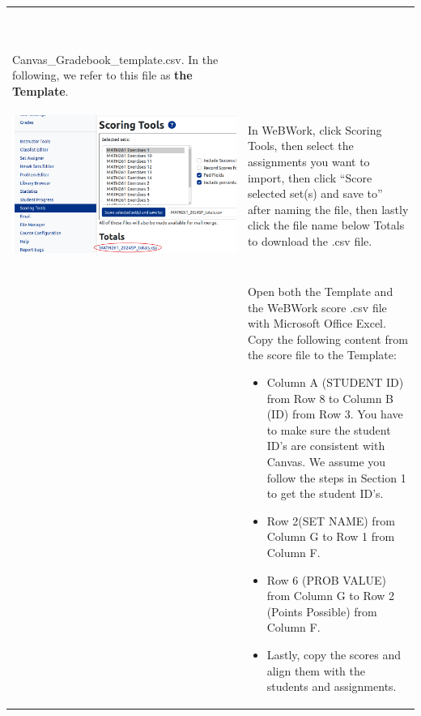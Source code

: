 \documentclass{article}
\begin{document}
{\centering
\begin{longtable}{|l|l|}
\hline
\begin{parbox}{0.45\textwidth}{\ }
\end{parbox}&\begin{parbox}{0.45\textwidth}{Download a copy of\\ Canvas\_Gradebook\_template.csv. In the following, we refer to this file as {\bf the Template}. }
\end{parbox}\\
\hline
\begin{parbox}{0.45\textwidth}{\includegraphics[width=.45\textwidth]{scoringTools.png}}
\end{parbox}&\begin{parbox}{0.45\textwidth}{In WeBWork, click Scoring Tools, then select the assignments you want to import, then click ``Score selected set(s) and save to'' after naming the file, then lastly click the file name below Totals to download the .csv file. }
\end{parbox}\\
\hline
\begin{parbox}{0.45\textwidth}{\ }
\end{parbox}&\begin{parbox}{0.45\textwidth}{Open both the Template and the WeBWork score .csv file with Microsoft Office Excel. Copy the following content from the score file to the Template:
\begin{itemize}
\item
Column A (STUDENT ID) from Row 8 to Column B (ID) from Row 3. You have to make sure the student ID's are consistent with Canvas. We assume you follow the steps in Section 1 to get the student ID's.
\item Row 2(SET NAME) from Column G to Row 1 from Column F.
\item Row 6 (PROB VALUE) from Column G to Row 2 (Points Possible) from Column F.
\item Lastly, copy the scores and align them with the students and assignments.
\end{itemize}
}
\end{parbox}\\

\end{longtable}}
\end{document}

